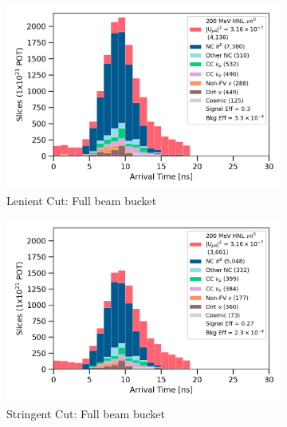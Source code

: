 \begin{figure}[htbp!]
	\hfill
	\begin{subfigure}[b]{0.495\textwidth}   
            \centering 
            \includegraphics[width=\textwidth]{bb_lenient_full}
            \caption{Lenient Cut: Full beam bucket}%
	    \label{fig:bb_full_loose}
        \end{subfigure}
        \hfill
	\begin{subfigure}[b]{0.495\textwidth}   
            \centering 
            \includegraphics[width=\textwidth]{bb_stringent_full}
            \caption{Stringent Cut: Full beam bucket}%
	    \label{fig:bb_full_strict}
        \end{subfigure}
	\hfill
        \begin{subfigure}[b]{0.495\textwidth}   
            \centering 

\end{subfigure}
\end{figure}
